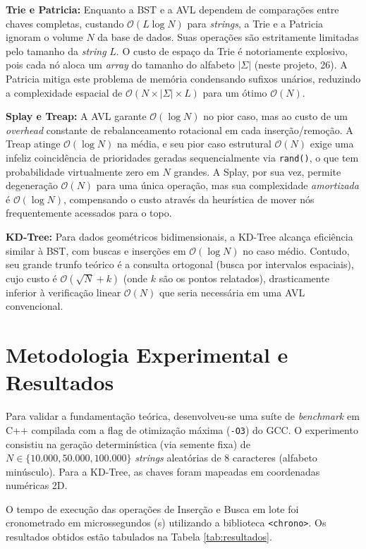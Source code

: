 \documentclass[conference]{IEEEtran}
\begin{document}
\textbf{Trie e Patricia:} Enquanto a BST e a AVL dependem de comparações entre chaves completas, custando $\mathcal{O}(L \log N)$ para \textit{strings}, a Trie e a Patricia ignoram o volume $N$ da base de dados. Suas operações são estritamente limitadas pelo tamanho da \textit{string} $L$. O custo de espaço da Trie é notoriamente explosivo, pois cada nó aloca um \textit{array} do tamanho do alfabeto $|\Sigma|$ (neste projeto, 26). A Patricia mitiga este problema de memória condensando sufixos unários, reduzindo a complexidade espacial de $\mathcal{O}(N \times |\Sigma| \times L)$ para um ótimo $\mathcal{O}(N)$.

\textbf{Splay e Treap:} A AVL garante $\mathcal{O}(\log N)$ no pior caso, mas ao custo de um \textit{overhead} constante de rebalanceamento rotacional em cada inserção/remoção. A Treap atinge $\mathcal{O}(\log N)$ na média, e seu pior caso estrutural $\mathcal{O}(N)$ exige uma infeliz coincidência de prioridades geradas sequencialmente via \texttt{rand()}, o que tem probabilidade virtualmente zero em $N$ grandes. A Splay, por sua vez, permite degeneração $\mathcal{O}(N)$ para uma única operação, mas sua complexidade \textit{amortizada} é $\mathcal{O}(\log N)$, compensando o custo através da heurística de mover nós frequentemente acessados para o topo.

\textbf{KD-Tree:} Para dados geométricos bidimensionais, a KD-Tree alcança eficiência similar à BST, com buscas e inserções em $\mathcal{O}(\log N)$ no caso médio. Contudo, seu grande trunfo teórico é a consulta ortogonal (busca por intervalos espaciais), cujo custo é $\mathcal{O}(\sqrt{N} + k)$ (onde $k$ são os pontos relatados), drasticamente inferior à verificação linear $\mathcal{O}(N)$ que seria necessária em uma AVL convencional.

\section{Metodologia Experimental e Resultados}

Para validar a fundamentação teórica, desenvolveu-se uma suíte de \textit{benchmark} em C++ compilada com a flag de otimização máxima (\texttt{-O3}) do GCC. O experimento consistiu na geração determinística (via semente fixa) de $N \in \{10.000, 50.000, 100.000\}$ \textit{strings} aleatórias de 8 caracteres (alfabeto minúsculo). Para a KD-Tree, as chaves foram mapeadas em coordenadas numéricas 2D. 

O tempo de execução das operações de Inserção e Busca em lote foi cronometrado em microssegundos (\textmu s) utilizando a biblioteca \texttt{<chrono>}. Os resultados obtidos estão tabulados na Tabela \ref{tab:resultados}.
\end{document}
